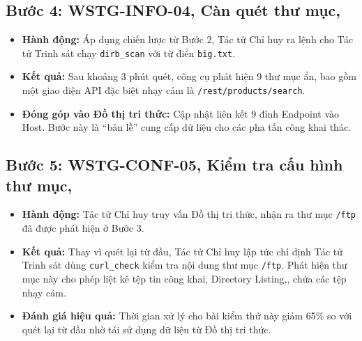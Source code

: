 \subsection{Bước 4: WSTG-INFO-04, Càn quét thư mục,}
\begin{itemize}
    \item \textbf{Hành động:} Áp dụng chiến lược từ Bước 2, Tác tử Chỉ huy ra lệnh cho Tác tử Trinh sát chạy \texttt{dirb\_scan} với từ điển \texttt{big.txt}.
    \item \textbf{Kết quả:} Sau khoảng 3 phút quét, công cụ phát hiện 9 thư mục ẩn, bao gồm một giao diện API đặc biệt nhạy cảm là \texttt{/rest/products/search}.
    \item \textbf{Đóng góp vào Đồ thị tri thức:} Cập nhật liên kết 9 đỉnh Endpoint vào Host. Bước này là ``bản lề'' cung cấp dữ liệu cho các pha tấn công khai thác.
\end{itemize}

\subsection{Bước 5: WSTG-CONF-05, Kiểm tra cấu hình thư mục,}
\begin{itemize}
    \item \textbf{Hành động:} Tác tử Chỉ huy truy vấn Đồ thị tri thức, nhận ra thư mục \texttt{/ftp} đã được phát hiện ở Bước 3.
    \item \textbf{Kết quả:} Thay vì quét lại từ đầu, Tác tử Chỉ huy lập tức chỉ định Tác tử Trinh sát dùng \texttt{curl\_check} kiểm tra nội dung thư mục \texttt{/ftp}. Phát hiện thư mục này cho phép liệt kê tệp tin công khai, Directory Listing,, chứa các tệp nhạy cảm.
    \item \textbf{Đánh giá hiệu quả:} Thời gian xử lý cho bài kiểm thử này giảm 65\% so với quét lại từ đầu nhờ tái sử dụng dữ liệu từ Đồ thị tri thức.
\end{itemize}

